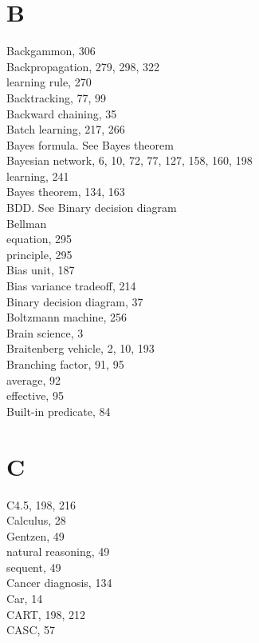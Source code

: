 \documentclass[10pt]{book}
\begin{document}
\section*{B}
Backgammon, 306\\
Backpropagation, 279, 298, 322\\
learning rule, 270\\
Backtracking, 77, 99\\
Backward chaining, 35\\
Batch learning, 217, 266\\
Bayes formula. See Bayes theorem\\
Bayesian network, 6, 10, 72, 77, 127, 158, 160, 198\\
learning, 241\\
Bayes theorem, 134, 163\\
BDD. See Binary decision diagram\\
Bellman\\
equation, 295\\
principle, 295\\
Bias unit, 187\\
Bias variance tradeoff, 214\\
Binary decision diagram, 37\\
Boltzmann machine, 256\\
Brain science, 3\\
Braitenberg vehicle, 2, 10, 193\\
Branching factor, 91, 95\\
average, 92\\
effective, 95\\
Built-in predicate, 84

\section*{C}
C4.5, 198, 216\\
Calculus, 28\\
Gentzen, 49\\
natural reasoning, 49\\
sequent, 49\\
Cancer diagnosis, 134\\
Car, 14\\
CART, 198, 212\\
CASC, 57
\end{document}
